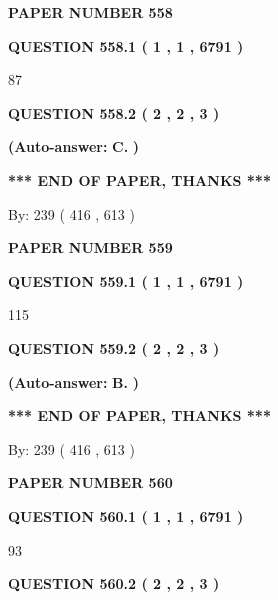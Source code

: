 \documentclass[12pt]{article}
\begin{document}
   
\newpage 
\setcounter{page}{ 
   558001 } 
   
   
 {\textbf{ \Large{ PAPER NUMBER  558  }}}
   
   
   
   
  
  
{\textbf{\large{QUESTION
558.1 
 ( 1 , 1 , 6791 )
}}}

87
  
  
{\textbf{\large{QUESTION
558.2 
 ( 2 , 2 , 3 )
}}}
 
 
{\textbf{(Auto-answer:}}
{\textbf{\large{
C.}}}
{\textbf{)}}
 
 
   
   
   
   
\vspace{1.0in} 
{\textbf{\large{ *** END OF PAPER, THANKS *** }}} 
   
   
\hspace{1.0in} By: 
 239 ( 416 ,  613 )
   
   
   
   
\newpage 
\setcounter{page}{ 
   559001 } 
   
   
 {\textbf{ \Large{ PAPER NUMBER  559  }}}
   
   
   
   
  
  
{\textbf{\large{QUESTION
559.1 
 ( 1 , 1 , 6791 )
}}}

115
  
  
{\textbf{\large{QUESTION
559.2 
 ( 2 , 2 , 3 )
}}}
 
 
{\textbf{(Auto-answer:}}
{\textbf{\large{
B.}}}
{\textbf{)}}
 
 
   
   
   
   
\vspace{1.0in} 
{\textbf{\large{ *** END OF PAPER, THANKS *** }}} 
   
   
\hspace{1.0in} By: 
 239 ( 416 ,  613 )
   
   
   
   
\newpage 
\setcounter{page}{ 
   560001 } 
   
   
 {\textbf{ \Large{ PAPER NUMBER  560  }}}
   
   
   
   
  
  
{\textbf{\large{QUESTION
560.1 
 ( 1 , 1 , 6791 )
}}}

93
  
  
{\textbf{\large{QUESTION
560.2 
 ( 2 , 2 , 3 )
}}}
 
\end{document}
